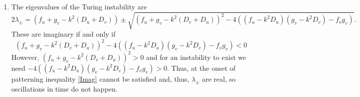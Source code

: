\documentclass[10pt]{article}
\newcommand{\bb}{\begin{equation}}
\newcommand{\ee}{\end{equation}}
\newcommand{\eqn}[1]{equation \eqref{#1}}
\renewcommand{\l}{\left(}
\renewcommand{\r}{\right)}
\begin{document}
\begin{Answ}
\begin{enumerate}
Knowing these signs and that \eqn{Eig_eqn} must be satisfied we know that $\epsilon_1$ and $\epsilon_2$ must satisfy
\bb
\l\begin {array}{cc} s^?_1 & s^+_2 \\  s^-_3 & s^-_4 \end {array}
\r \l\begin {array}{c} \epsilon_1 \\ \epsilon_2\end {array} \r=0,\implies \begin {array}{c} s^?_1\epsilon_1+s^+_2\epsilon_2=0, \\  s^-_3\epsilon_1 + s^-_4\epsilon_2=0, \end {array}
\ee
where $s^i_j$ is some real number with sign $i$. The equation with unknown sign does not help. However, rearranging the other equation leads to
\bb
\frac{\epsilon_1}{\epsilon_2}=-\frac{s^-_3}{s^-_4}.\label{Signs}
\ee
Since $s^-_3$ and $s^-_4$ are both negative the right-hand side of  
\eqn{Signs} is negative, thus, we deduce that $\epsilon_1$ and $\epsilon_2$ must be of opposite sign. Finally, without loss of generality, let $\epsilon_1>0>\epsilon_2$ this means that the perturbation to $u_s$ is a positive cosine, whilst the perturbation to $v_s$ is a negative cosine and, thus, the patterns are out of phase.

The above logic can be followed with the pure kinetic sign structure. However, in this case you should derive that
\bb
\l\begin {array}{cc} s^?_1 & s^-_2 \\  s^+_3 & s^-_4 \end {array}
\r \l\begin {array}{c} \epsilon_1 \\ \epsilon_2\end {array} \r=0,\implies \begin {array}{c} s^?_1\epsilon_1+s^-_2\epsilon_2=0, \\  s^+_3\epsilon_1 + s^-_4\epsilon_2=0, \end {array}
\ee
resulting in
\bb
\frac{\epsilon_1}{\epsilon_2}=-\frac{s^+_3}{s^-_4}.\label{Signs2}
\ee
The right-hand sign on \eqn{Signs2} is positive, meaning that $\epsilon_1$ and $\epsilon_2$ are the same sign. Thus, the perturbations to the steady states are in phase.

\item The eigenvalues of the Turing instability are
\bb
2\lambda_\pm=(f_u+g_v-k^2(D_u+D_v))\pm\sqrt{(f_u+g_v-k^2(D_v+D_u))^2-4((f_u-k^2D_u)(g_v-k^2D_v)-f_vg_v)}.
\ee
These are imaginary if and only if
\bb
(f_u+g_v-k^2(D_v+D_u))^2-4((f_u-k^2D_u)(g_v-k^2D_v)-f_vg_v)<0 \label{Imag}
\ee
However, $(f_u+g_v-k^2(D_v+D_u))^2>0$ and for an instability to exist we need $-4((f_u-k^2D_u)(g_v-k^2D_v)-f_vg_v)>0$. Thus, at the onset of patterning inequality \eqref{Imag} cannot be satisfied and, thus, $\lambda_\pm$ are real, so oscillations in time do not happen.


\end{enumerate}
\end{Answ}
\end{document}
